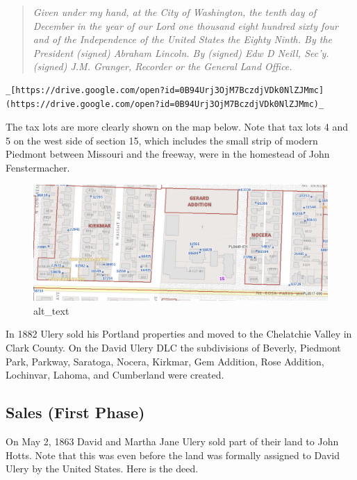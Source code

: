 \documentclass[
  12pt,
]{book}
\begin{document}
\begin{quote}
\emph{Given under my hand, at the City of Washington, the tenth day of December in the year of our Lord one thousand eight hundred sixty four and of the Independence of the United States the Eighty Ninth. By the President (signed) Abraham Lincoln. By (signed) Edw D Neill, Sec'y. (signed) J.M. Granger, Recorder or the General Land Office.}
\end{quote}

\begin{verbatim}
_[https://drive.google.com/open?id=0B94Urj3OjM7BczdjVDk0NlZJMmc](https://drive.google.com/open?id=0B94Urj3OjM7BczdjVDk0NlZJMmc)_
\end{verbatim}

The tax lots are more clearly shown on the map below. Note that tax lots 4 and 5 on the west side of section 15, which includes the small strip of modern Piedmont between Missouri and the freeway, were in the homestead of John Fenstermacher.

\begin{figure}
\centering
\includegraphics{images/0202a_images/image2.png}
\caption{alt\_text}
\end{figure}

In 1882 Ulery sold his Portland properties and moved to the Chelatchie Valley in Clark County. On the David Ulery DLC the subdivisions of Beverly, Piedmont Park, Parkway, Saratoga, Nocera, Kirkmar, Gem Addition, Rose Addition, Lochinvar, Lahoma, and Cumberland were created.

\hypertarget{sales-first-phase}{%
\subsection{Sales (First Phase)}\label{sales-first-phase}}

On May 2, 1863 David and Martha Jane Ulery sold part of their land to John Hotts. Note that this was even before the land was formally assigned to David Ulery by the United States. Here is the deed.
\end{document}
